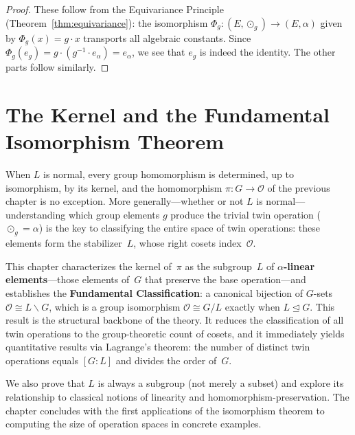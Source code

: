 \documentclass[11pt,a4paper,openany]{book}
\theoremstyle{plain}
\theoremstyle{definition}
\newcommand{\twing}[1]{\odot_{#1}}
\newcommand{\opspace}{\mathcal{O}}
\newcommand{\lingroup}{L}
\newcommand{\actspace}{E}
\newcommand{\groupG}{G}
\begin{document}
\begin{proof}
These follow from the Equivariance Principle (Theorem~\ref{thm:equivariance}): the isomorphism $\Phi_g : (\actspace, \twing{g}) \to (\actspace, \alpha)$ given by $\Phi_g(x) = g \cdot x$ transports all algebraic constants. Since $\Phi_g(e_g) = g \cdot (g^{-1} \cdot e_\alpha) = e_\alpha$, we see that $e_g$ is indeed the identity. The other parts follow similarly.
\end{proof}


\chapter[Kernel and Isomorphism]{The Kernel and the Fundamental\\Isomorphism Theorem}
\label{ch:kernel}

When $\lingroup$ is normal, every group homomorphism is determined, up to isomorphism, by its kernel, and the homomorphism $\pi: \groupG \to \opspace$ of the previous chapter is no exception. More generally---whether or not $\lingroup$ is normal---understanding which group elements $g$ produce the trivial twin operation ($\twing{g} = \alpha$) is the key to classifying the entire space of twin operations: these elements form the stabilizer~$\lingroup$, whose right cosets index~$\opspace$.

This chapter characterizes the kernel of~$\pi$ as the subgroup~$\lingroup$ of \textbf{$\alpha$-linear elements}---those elements of~$\groupG$ that preserve the base operation---and establishes the \textbf{Fundamental Classification}: a canonical bijection of $\groupG$-sets $\opspace \cong \lingroup\backslash\groupG$, which is a group isomorphism $\opspace\cong\groupG/\lingroup$ exactly when $\lingroup\trianglelefteq\groupG$. This result is the structural backbone of the theory. It reduces the classification of all twin operations to the group-theoretic count of cosets, and it immediately yields quantitative results via Lagrange's theorem: the number of distinct twin operations equals $[\groupG:\lingroup]$ and divides the order of~$\groupG$.

We also prove that $\lingroup$ is always a subgroup (not merely a subset) and explore its relationship to classical notions of linearity and homomorphism-preservation. The chapter concludes with the first applications of the isomorphism theorem to computing the size of operation spaces in concrete examples.
\end{document}
